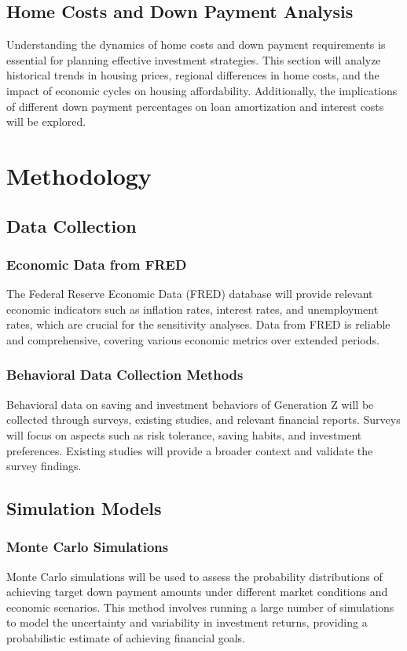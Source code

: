 \documentclass[12pt]{report}
\begin{document}
\section{Home Costs and Down Payment Analysis}
Understanding the dynamics of home costs and down payment requirements is essential for planning effective investment strategies. This section will analyze historical trends in housing prices, regional differences in home costs, and the impact of economic cycles on housing affordability. Additionally, the implications of different down payment percentages on loan amortization and interest costs will be explored.

\chapter{Methodology}
\section{Data Collection}
\subsection{Economic Data from FRED}
The Federal Reserve Economic Data (FRED) database will provide relevant economic indicators such as inflation rates, interest rates, and unemployment rates, which are crucial for the sensitivity analyses. Data from FRED is reliable and comprehensive, covering various economic metrics over extended periods.

\subsection{Behavioral Data Collection Methods}
Behavioral data on saving and investment behaviors of Generation Z will be collected through surveys, existing studies, and relevant financial reports. Surveys will focus on aspects such as risk tolerance, saving habits, and investment preferences. Existing studies will provide a broader context and validate the survey findings.

\section{Simulation Models}
\subsection{Monte Carlo Simulations}
Monte Carlo simulations will be used to assess the probability distributions of achieving target down payment amounts under different market conditions and economic scenarios. This method involves running a large number of simulations to model the uncertainty and variability in investment returns, providing a probabilistic estimate of achieving financial goals.
\end{document}
